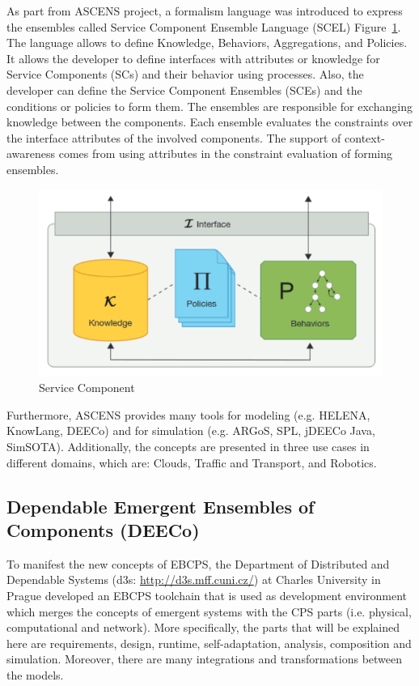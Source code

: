 As part from ASCENS project, a formalism language was introduced to express the ensembles called Service Component Ensemble Language (SCEL) Figure~\ref{fig:Service_Component}. The language allows to define Knowledge, Behaviors, Aggregations, and Policies. It allows the developer to define  interfaces with attributes or knowledge for Service Components (SCs) and their behavior using processes. Also, the developer can define the Service Component Ensembles (SCEs) and the conditions or policies to form them. The ensembles are responsible for exchanging knowledge between the components. Each ensemble evaluates the constraints over the interface attributes of the involved components. The support of context-awareness comes from using attributes in the constraint evaluation of forming ensembles.  
\begin{figure}[!htb]
\centering
\includegraphics[scale=0.44]{figures/ServiceComponent.PNG}
\caption{Service Component}
\label{fig:Service_Component}
\end{figure}

Furthermore, ASCENS provides many tools for modeling (e.g. HELENA, KnowLang, DEECo) and for simulation (e.g. ARGoS, SPL, jDEECo Java, SimSOTA). Additionally, the concepts are presented in three use cases in different domains, which are: Clouds, Traffic and Transport, and Robotics.


\subsection{Dependable Emergent Ensembles of Components (DEECo)}
To manifest the new concepts of EBCPS, the Department of Distributed and Dependable Systems (d3s: \url{http://d3s.mff.cuni.cz/}) at Charles University in Prague developed an EBCPS toolchain that is used as development environment which merges the concepts of emergent systems with the CPS parts (i.e. physical, computational and network). More specifically, the parts that will be explained here are requirements, design, runtime, self-adaptation, analysis, composition and simulation. Moreover, there are many integrations and transformations between the models.


